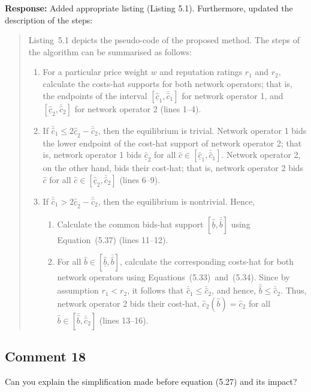 \documentclass[10pt,a4paper,notitlepage]{article}
\numberwithin{equation}{section}
\begin{document}
\textbf{Response:}
Added appropriate listing (Listing 5.1). Furthermore, updated the description of the steps:
\begin{quote}
Listing~5.1 depicts the pseudo-code of the proposed method. The steps of the algorithm can be summarised as follows:
\begin{enumerate}
\item For a particular price weight $w$ and reputation ratings $r_1$ and $r_2$, calculate the costs-hat supports for both network operators; that is, the endpoints of the interval $[\underline{\hat{c}}_1, \bar{\hat{c}}_1]$ for network operator 1, and $[\underline{\hat{c}}_2, \bar{\hat{c}}_2]$ for network operator 2 (lines 1--4).
\item If $\bar{\hat{c}}_1 \le 2\underline{\hat{c}}_2 - \bar{\hat{c}}_2$, then the equilibrium is trivial. Network operator 1 bids the lower endpoint of the cost-hat support of network operator 2; that is, network operator 1 bids $\underline{\hat{c}}_2$ for all $\hat{c}\in [\underline{\hat{c}}_1, \bar{\hat{c}}_1]$. Network operator 2, on the other hand, bids their cost-hat; that is, network operator 2 bids $\hat{c}$ for all $\hat{c}\in [\underline{\hat{c}}_2, \bar{\hat{c}}_2]$ (lines 6--9).
\item If $\bar{\hat{c}}_1 > 2\underline{\hat{c}}_2 - \bar{\hat{c}}_2$, then the equilibrium is nontrivial. Hence,
\begin{enumerate}
\item Calculate the common bids-hat support $[\underline{\hat{b}}, \bar{\hat{b}}]$ using Equation~(5.37) (lines 11--12).
\item For all $\hat{b}\in [\underline{\hat{b}}, \bar{\hat{b}}]$, calculate the corresponding costs-hat for both network operators using Equations~(5.33)~and~(5.34). Since by assumption $r_1 < r_2$, it follows that $\bar{\hat{c}}_1 \le \bar{\hat{c}}_2$, and hence, $\bar{\hat{b}}\le \bar{\hat{c}}_2$. Thus, network operator 2 bids their cost-hat, $\hat{c}_2(\hat{b}) = \hat{c}_2$ for all $\hat{b}\in [\bar{\hat{b}}, \bar{\hat{c}}_2]$ (lines 13--16).
\end{enumerate}
\end{enumerate}
\end{quote}

\subsection{Comment 18}
Can you explain the simplification made before equation (5.27) and its impact?\\[-2ex]
\end{document}
